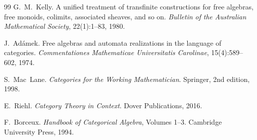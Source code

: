 \documentclass[UTF8,a4paper,12pt]{ctexart}
\theoremstyle{definition}
\theoremstyle{plain}
\theoremstyle{remark}
\begin{document}
\nocite{*}
\begin{thebibliography}{99}
 G.~M.~Kelly.
\newblock A unified treatment of transfinite constructions for free algebras, free monoids, colimits, associated sheaves, and so on.
\newblock \emph{Bulletin of the Australian Mathematical Society}, 22(1):1--83, 1980.

 J.~Ad\'amek.
\newblock Free algebras and automata realizations in the language of categories.
\newblock \emph{Commentationes Mathematicae Universitatis Carolinae}, 15(4):589--602, 1974.

 S.~Mac~Lane.
\newblock \emph{Categories for the Working Mathematician}.
\newblock Springer, 2nd edition, 1998.

 E.~Riehl.
\newblock \emph{Category Theory in Context}.
\newblock Dover Publications, 2016.

 F.~Borceux.
\newblock \emph{Handbook of Categorical Algebra}, Volumes 1--3.
\newblock Cambridge University Press, 1994.
\end{thebibliography}
\end{document}
